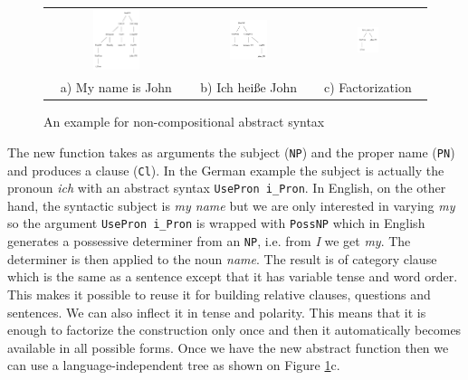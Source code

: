 \documentclass[output=paper]{LSP/langsci}
\begin{document}
\begin{figure}
    \centering
    \begin{tabular}{ccc}
       \includegraphics[width=0.35\textwidth]{figures/engname.png} &
       \includegraphics[width=0.35\textwidth]{figures/gername.png} &
       \includegraphics[width=0.2\textwidth]{figures/hasname.png} \\
       a) My name is John &
       b) Ich hei{\ss}e John &
       c) Factorization
    \end{tabular}
    \caption{An example for non-compositional abstract syntax}
   \label{fig:have_name}
\end{figure}

The new function takes as arguments the subject (\verb=NP=) and 
the proper name (\verb=PN=) and produces a clause (\verb=Cl=).
In the German example the subject is actually the pronoun \textit{ich}
with an abstract syntax \verb=UsePron i_Pron=. In English, on the
other hand, the syntactic subject is \textit{my name} but we are only
interested in varying \textit{my} so the argument \verb=UsePron i_Pron=
is wrapped with \verb=PossNP= which in English generates a possessive determiner
from an \verb=NP=, i.e. from \textit{I} we get \textit{my}. The determiner
is then applied to the noun \textit{name}.
The result is of category clause which is the same as a sentence except that it has 
variable tense and word order. This makes it possible to reuse it for building 
relative clauses, questions and sentences. We can also inflect it 
in tense and polarity. This means that it is enough to factorize 
the construction only once and then it automatically becomes available 
in all possible forms. Once we have the new abstract function then 
we can use a language-independent tree as shown on Figure \ref{fig:have_name}c.
\end{document}
